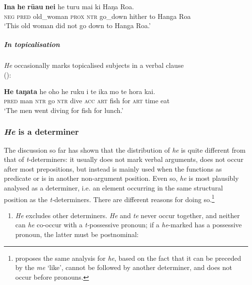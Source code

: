 \ea\label{ex:5.48}
\gll \textbf{{\ꞌ}Ina} \textbf{he} \textbf{rū{\ꞌ}au} \textbf{nei} he turu mai ki Haŋa Roa. \\
\textsc{neg} \textsc{pred} old\_woman \textsc{prox} \textsc{ntr} go\_down hither to Hanga Roa \\

\glt 
‘This old woman did not go down to Hanga Roa.’ \textstyleExampleref{[R380.006]} 
\z

\subparagraph{In topicalisation} \textit{He} occasionally marks topicalised subjects in a verbal clause\\ ():

\ea\label{ex:5.49}
\gll \textbf{He} \textbf{taŋata} he oho he ruku i te ika mo te hora kai. \\
\textsc{pred} man \textsc{ntr} go \textsc{ntr} dive \textsc{acc} \textsc{art} fish for \textsc{art} time eat \\

\glt 
‘The men went diving for fish for lunch.’ \textstyleExampleref{[R183.019]} 
\z

\subsubsection{\textit{He} is a determiner}\label{sec:5.3.4.2}

The discussion so far has shown that the distribution of \textit{he} is quite different from that of \textit{t}{}-determiners: it usually does not mark verbal arguments, does not occur after most prepositions, but instead is mainly used when the  functions as predicate or is in another non-argument position. Even so, \textit{he} is most plausibly analysed as a determiner, i.e. an element occurring in the same structural position as the \textit{t-}determiners. There are different reasons for doing so.\footnote{\label{fn:257}\citet{Cook1999} proposes the same analysis for  \textit{he}, based on the fact that it can be preceded by the  \textit{me} ‘like’, cannot be followed by another determiner, and does not occur before pronouns.} 

\begin{enumerate}
\item
\textit{He} excludes other determiners. \textit{He} and \textit{te} never occur together, and neither can \textit{he} co-occur with a \textit{t-}possessive pronoun; if a \textit{he}{}-marked  has a possessive pronoun, the latter must be postnominal:
\end{enumerate}


